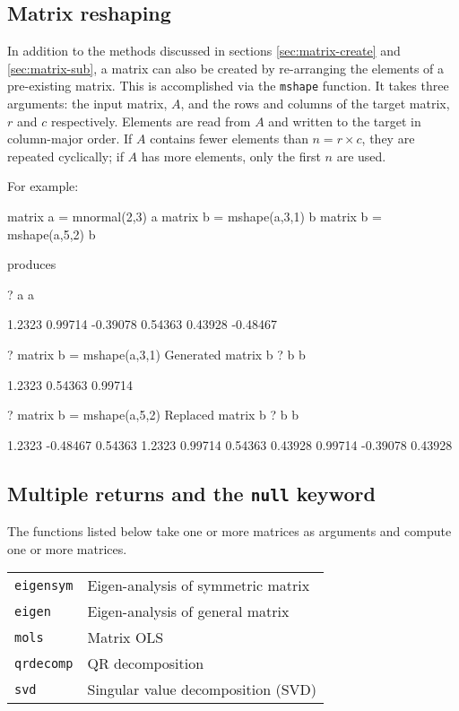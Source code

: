 \subsection{Matrix reshaping}
\label{matrix-mshape}

In addition to the methods discussed in sections
\ref{sec:matrix-create} and \ref{sec:matrix-sub}, a matrix can also be
created by re-arranging the elements of a pre-existing matrix. This is
accomplished via the \texttt{mshape} function. It takes three
arguments: the input matrix, $A$, and the rows and columns of the
target matrix, $r$ and $c$ respectively.  Elements are read from $A$
and written to the target in column-major order.  If $A$ contains
fewer elements than $n = r \times c$, they are repeated cyclically; if
$A$ has more elements, only the first $n$ are used.

For example:
\begin{code}
matrix a = mnormal(2,3)
a
matrix b = mshape(a,3,1)
b
matrix b = mshape(a,5,2)
b
\end{code}
produces
\begin{code}
?   a
a

      1.2323      0.99714     -0.39078
     0.54363      0.43928     -0.48467

?   matrix b = mshape(a,3,1)
Generated matrix b
?   b
b

      1.2323
     0.54363
     0.99714

?   matrix b = mshape(a,5,2)
Replaced matrix b
?   b
b

      1.2323     -0.48467
     0.54363       1.2323
     0.99714      0.54363
     0.43928      0.99714
    -0.39078      0.43928
\end{code}

\subsection{Multiple returns and the \texttt{null} keyword}
\label{matrix-multiples}

The functions listed below take one or more matrices as arguments and
compute one or more matrices.

\begin{center}
\begin{tabular}{ll}
\texttt{eigensym} & Eigen-analysis of symmetric matrix \\
\texttt{eigen}    & Eigen-analysis of general matrix \\
\texttt{mols}     & Matrix OLS \\
\texttt{qrdecomp} & QR decomposition \\
\texttt{svd}      & Singular value decomposition (SVD) 
\end{tabular}
\end{center}

